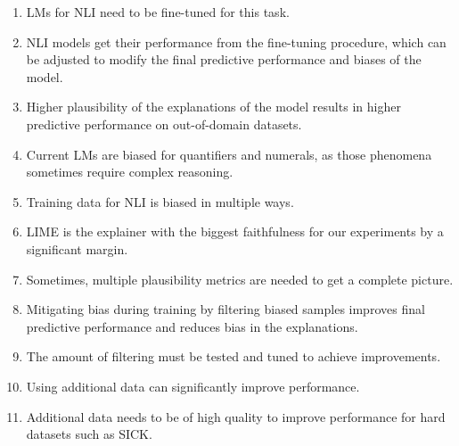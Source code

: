 \begin{enumerate}
    \item \acp{LM} for \ac{NLI} need to be fine-tuned for this task.
    \item \ac{NLI} models get their performance from the fine-tuning procedure, which can be adjusted to modify the final predictive performance and biases of the model.
    \item Higher plausibility of the explanations of the model results in higher predictive performance on out-of-domain datasets.
    \item Current \acp{LM} are biased for quantifiers and numerals, as those phenomena sometimes require complex reasoning.
    \item Training data for \ac{NLI} is biased in multiple ways.
    \item \acs{LIME} is the explainer with the biggest faithfulness for our experiments by a significant margin.
    \item Sometimes, multiple plausibility metrics are needed to get a complete picture.
    \item Mitigating bias during training by filtering biased samples improves final predictive performance and reduces bias in the explanations.
    \item The amount of filtering must be tested and tuned to achieve improvements.
    \item Using additional data can significantly improve performance.
    \item Additional data needs to be of high quality to improve performance for hard datasets such as \acs{SICK}.
\end{enumerate}
